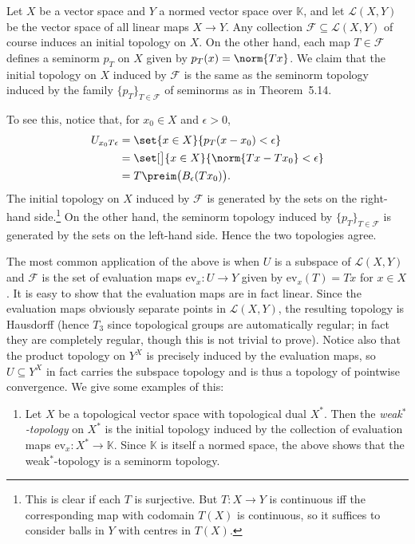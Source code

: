 \documentclass[article, a4paper, 11pt, oneside]{memoir}
\numberwithin{equation}{chapter}
\newcommand{\ev}{\mathrm{ev}}
\newcommand{\calF}{\mathcal{F}}
\newcommand{\calL}{\mathcal{L}}
\newcommand{\bbK}{\mathbb{K}}
\theoremstyle{nonumberplain}
\begin{document}
\begin{remarkbreak}
	Let $X$ be a vector space and $Y$ a normed vector space over $\bbK$, and let $\calL(X,Y)$ be the vector space of all linear maps $X \to Y$. Any collection $\calF \subseteq \calL(X,Y)$ of course induces an initial topology on $X$. On the other hand, each map $T \in \calF$ defines a seminorm $p_T$ on $X$ given by $p_T(x) = \norm{Tx}$. We claim that the initial topology on $X$ induced by $\calF$ is the same as the seminorm topology induced by the family $\{p_T\}_{T \in \calF}$ of seminorms as in Theorem~5.14.

	To see this, notice that, for $x_0 \in X$ and $\epsilon > 0$,
	\begin{align*}
		U_{x_0 T \epsilon}
			&= \set{ x \in X }{ p_T(x-x_0) < \epsilon } \\
			&= \set[\big]{ x \in X }{ \norm{Tx-Tx_0} < \epsilon } \\
			&= T\preim \bigl( B_\epsilon(Tx_0) \bigr).
	\end{align*}
	The initial topology on $X$ induced by $\calF$ is generated by the sets on the right-hand side.\footnote{This is clear if each $T$ is surjective. But $T \colon X \to Y$ is continuous iff the corresponding map with codomain $T(X)$ is continuous, so it suffices to consider balls in $Y$ with centres in $T(X)$.} On the other hand, the seminorm topology induced by $\{p_T\}_{T \in \calF}$ is generated by the sets on the left-hand side. Hence the two topologies agree.

	The most common application of the above is when $U$ is a subspace of $\calL(X,Y)$ and $\calF$ is the set of evaluation maps $\ev_x \colon U \to Y$ given by $\ev_x(T) = Tx$ for $x \in X$. It is easy to show that the evaluation maps are in fact linear. Since the evaluation maps obviously separate points in $\calL(X,Y)$, the resulting topology is Hausdorff (hence $T_3$ since topological groups are automatically regular; in fact they are completely regular, though this is not trivial to prove). Notice also that the product topology on $Y^X$ is precisely induced by the evaluation maps, so $U \subseteq Y^X$ in fact carries the subspace topology and is thus a topology of pointwise convergence. We give some examples of this:
	\begin{enumerate}
		\item Let $X$ be a topological vector space with topological dual $X^*$. Then the \emph{weak$^*$-topology} on $X^*$ is the initial topology induced by the collection of evaluation maps $\ev_x \colon X^* \to \bbK$. Since $\bbK$ is itself a normed space, the above shows that the weak$^*$-topology is a seminorm topology.


\end{enumerate}
\end{remarkbreak}
\end{document}
